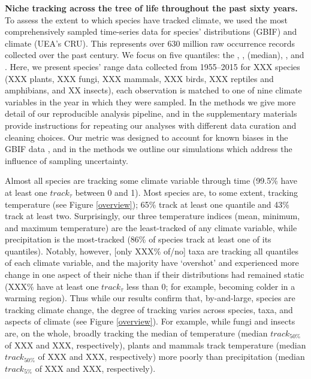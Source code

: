 \documentclass[12pt]{report}
\begin{document}
\textbf{Niche tracking across the tree of life throughout the past
  sixty years.} To assess the extent to which species have tracked
climate, we used the most comprehensively sampled time-series data for
species' distributions (GBIF\supercite{url_gbif}) and climate (UEA's
CRU\supercite{Harris2014}). This represents over 630 million raw
occurrence records collected over the past century. We focus on five
quantiles: the , ,  (median), , and
. Here, we present species' range data collected from
1955--2015 for XXX species (XXX plants, XXX fungi, XXX mammals, XXX
birds, XXX reptiles and amphibians, and XX insects), each observation
is matched to one of nine climate variables in the year in which they
were sampled. In the methods we give more detail of our reproducible
analysis pipeline, and in the supplementary materials provide
instructions for repeating our analyses with different data curation
and cleaning choices. Our metric was designed to account for known
biases in the GBIF data \supercite{Beck2014}, and in the methods we
outline our simulations which address the influence of sampling
uncertainty.

Almost all species are tracking some climate variable through time
(99.5\% have at least one $track_\tau$ between 0 and 1). Most species
are, to some extent, tracking temperature (see Figure \ref{overview});
65\% track at least one quantile and 43\% track at least
two. Surprisingly, our three temperature indices (mean, minimum, and
maximum temperature) are the least-tracked of any climate variable,
while precipitation is the most-tracked (86\% of species track at
least one of its quantiles). Notably, however, [only XXX\% of/no] taxa
are tracking all quantiles of each climate variable, and the majority
have `overshot' and experienced more change in one aspect of their
niche than if their distributions had remained static (XXX\% have at
least one $track_\tau$ less than 0; for example, becoming colder in a
warming region). Thus while our results confirm that, by-and-large,
species are tracking climate change, the degree of tracking varies
across species, taxa, and aspects of climate (see Figure
\ref{overview}). For example, while fungi and insects are, on the
whole, broadly tracking the median of temperature (median
$track_{50\%}$ of XXX and XXX, respectively), plants and mammals track
temperature (median $track_{50\%}$ of XXX and XXX, respectively) more
poorly than precipitation (median $track_{5\%}$ of XXX and XXX,
respectively).
\end{document}
